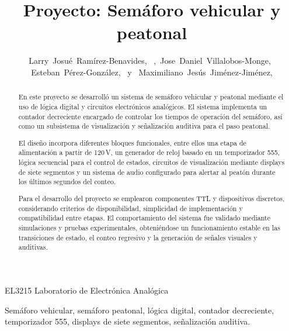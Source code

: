 \documentclass[journal, onecolumn]{IEEEtran}
\begin{document}
\title{Proyecto: Semáforo vehicular y peatonal}

\author{Larry~Josué~Ramírez-Benavides,~ ,~Jose~Daniel~Villalobos-Monge,~  ~Esteban~Pérez-González,~ y ~Maximiliano~Jesús~Jiménez-Jiménez,~
}

%
{EL3215 Laboratorio de Electrónica Analógica}

\maketitle

\begin{abstract}

En este proyecto se desarrolló un sistema de semáforo vehicular y peatonal mediante el uso de lógica digital y circuitos electrónicos analógicos. El sistema implementa un contador decreciente encargado de controlar los tiempos de operación del semáforo, así como un subsistema de visualización y señalización auditiva para el paso peatonal. 

El diseño incorpora diferentes bloques funcionales, entre ellos una etapa de alimentación a partir de 120\,V, un generador de reloj basado en un temporizador 555, lógica secuencial para el control de estados, circuitos de visualización mediante displays de siete segmentos y un sistema de audio configurado para alertar al peatón durante los últimos segundos del conteo.

Para el desarrollo del proyecto se emplearon componentes TTL y dispositivos discretos, considerando criterios de disponibilidad, simplicidad de implementación y compatibilidad entre etapas. El comportamiento del sistema fue validado mediante simulaciones y pruebas experimentales, obteniéndose un funcionamiento estable en las transiciones de estado, el conteo regresivo y la generación de señales visuales y auditivas.

\end{abstract}

\begin{IEEEkeywords}
Semáforo vehicular, semáforo peatonal, lógica digital, contador decreciente, temporizador 555, displays de siete segmentos, señalización auditiva.
\end{IEEEkeywords}
\end{document}
